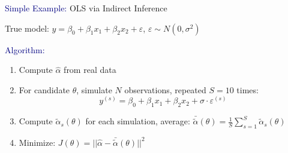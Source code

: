 \documentclass[aspectratio=169]{beamer}
\begin{document}
\begin{frame}

\textcolor{navy}{Simple Example:} OLS via Indirect Inference

\bigskip

True model: $y = \beta_0 + \beta_1 x_1 + \beta_2 x_2 + \varepsilon$, \quad $\varepsilon \sim N(0,\sigma^2)$

\bigskip


\bigskip


\end{frame}

\begin{frame}

\textcolor{navy}{Algorithm:}

\bigskip

\begin{enumerate}
\itemsep1.5em
\item<1-> Compute $\hat{\alpha}$ from real data
\item<2-> For candidate $\theta$, simulate $N$ observations, repeated $S=10$ times:
$$y^{(s)} = \beta_0 + \beta_1 x_1 + \beta_2 x_2 + \sigma \cdot \varepsilon^{(s)}$$
\item<3-> Compute $\tilde{\alpha}_s(\theta)$ for each simulation, average: $\bar{\tilde{\alpha}}(\theta) = \frac{1}{S}\sum_{s=1}^S \tilde{\alpha}_s(\theta)$
\item<4-> Minimize: $J(\theta) = ||\hat{\alpha} - \bar{\tilde{\alpha}}(\theta)||^2$
\end{enumerate}

\bigskip



\bigskip


\end{frame}
\end{document}

